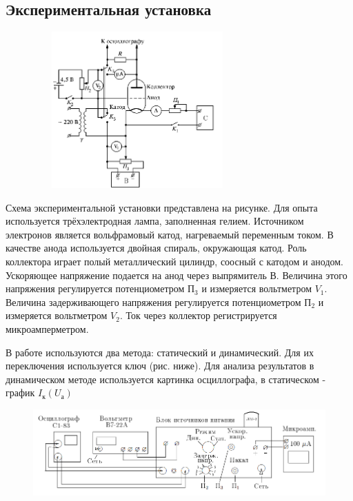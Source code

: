 \documentclass[12pt,a4paper]{article}
\begin{document}
\subsection{Экспериментальная установка}

\begin{figure}
	\vspace{-3ex}
	\includegraphics[width=8cm, height=6cm]{5.2.1-2}
\end{figure}	

Схема экспериментальной установки представлена на рисунке. Для опыта используется трёхэлектродная лампа, заполненная гелием. Источником электронов является вольфрамовый катод, нагреваемый переменным током. В качестве анода используется двойная спираль, окружающая катод. Роль коллектора играет полый металлический цилиндр, соосный с катодом и анодом. Ускоряющее напряжение подается на анод через выпрямитель В. Величина этого напряжения регулируется потенциометром П$_3$ и измеряется вольтметром $V_1$. Величина задерживающего напряжения регулируется потенциометром П$_2$ и измеряется вольтметром $V_2$. Ток через коллектор регистрируется микроамперметром.

	В работе используются два метода: статический и динамический. Для их переключения используется ключ (рис. ниже). Для анализа результатов в динамическом методе используется картинка осциллографа, в статическом - график $I_{\text{к}}(U_{\text{а}})$ 
	
\begin{figure}[H]
	\begin{center}
		\includegraphics[width=14cm]{5.2.1-3}
	\end{center}
\end{figure}
\end{document}
